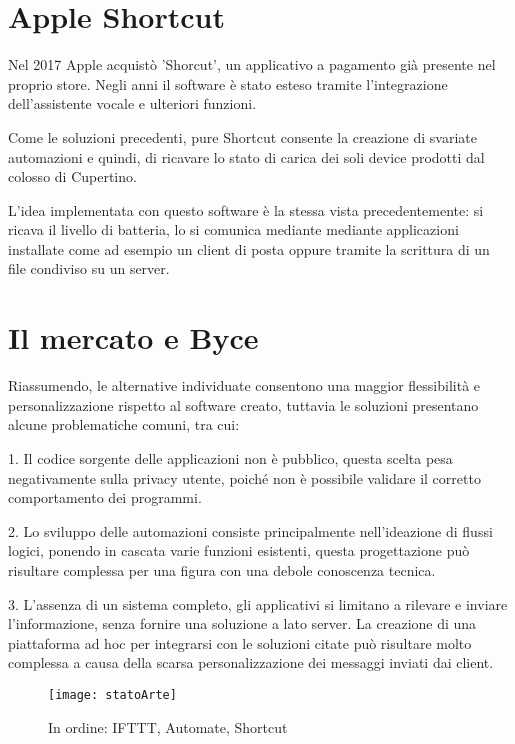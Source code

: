 \documentclass[target=bach]{thud}
\begin{document}
    \section{Apple Shortcut}

    Nel 2017 Apple acquistò 'Shorcut', un applicativo a pagamento già presente nel proprio store.
    Negli anni il software è stato esteso tramite l'integrazione dell'assistente vocale e ulteriori funzioni.

    Come le soluzioni precedenti, pure Shortcut consente la creazione di svariate automazioni e quindi, di ricavare lo stato di carica dei soli device prodotti dal colosso di Cupertino.

    L'idea implementata con questo software è la stessa vista precedentemente: si ricava il livello di batteria, lo si comunica mediante mediante applicazioni installate come ad esempio un client di posta oppure tramite la scrittura di un file condiviso su un server.

    \section{Il mercato e Byce}

    Riassumendo, le alternative individuate consentono una maggior flessibilità e personalizzazione rispetto al software creato, tuttavia le soluzioni presentano alcune problematiche comuni, tra cui:

    1. Il codice sorgente delle applicazioni non è pubblico, questa scelta pesa negativamente sulla privacy utente, poiché non è possibile validare il corretto comportamento dei programmi.

    2. Lo sviluppo delle automazioni consiste principalmente nell'ideazione di flussi logici, ponendo in cascata varie funzioni esistenti, questa progettazione può risultare complessa per una figura con una debole conoscenza tecnica.

    3. L'assenza di un sistema completo, gli applicativi si limitano a rilevare e inviare l'informazione, senza fornire una soluzione a lato server. La creazione di una piattaforma ad hoc per integrarsi con le soluzioni citate può risultare molto complessa a causa della scarsa personalizzazione dei messaggi inviati dai client.


    \graphicspath{ {./img/} }
    \begin{figure}[h]
        \texttt{[image: statoArte]}
        \caption{In ordine: IFTTT, Automate, Shortcut}
        \label{fig:usecase}
        \centering
    \end{figure}
\end{document}
